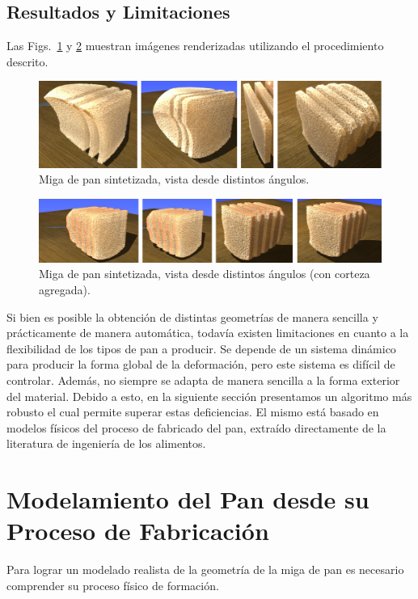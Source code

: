 \documentclass[spanish,a4paper,openright,11pt]{book}
\begin{document}
\subsection{Resultados y Limitaciones}
Las Figs.~\ref{fg:crumb} y \ref{fg:results2} muestran imágenes renderizadas utilizando el procedimiento descrito.

\begin{figure}
  \centerline{\includegraphics[width=15cm]{figures/crumb}}
  \caption{Miga de pan sintetizada, vista desde distintos ángulos.}
  \label{fg:crumb}
\end{figure}


\begin{figure}
  \centerline{\includegraphics[width=15cm]{figures/results2}}
  \caption{Miga de pan sintetizada, vista desde distintos ángulos (con corteza agregada).}
  \label{fg:results2}
\end{figure}

Si bien es posible la obtención de distintas geometrías de manera sencilla y prácticamente de manera automática, todavía existen limitaciones en cuanto a la flexibilidad de los tipos de pan a producir.
Se depende de un sistema dinámico para producir la forma global de la deformación, pero este sistema es difícil de controlar.
Además, no siempre se adapta de manera sencilla a la forma exterior del material.
Debido a esto, en la siguiente sección presentamos un algoritmo más robusto el cual permite superar estas deficiencias.
El mismo está basado en modelos físicos del proceso de fabricado del pan, extraído directamente de la literatura de ingeniería de los alimentos.

\section{Modelamiento del Pan desde su Proceso de Fabricación}
Para lograr un modelado realista de la geometría de la miga de pan es necesario comprender su proceso físico de formación.
\end{document}
